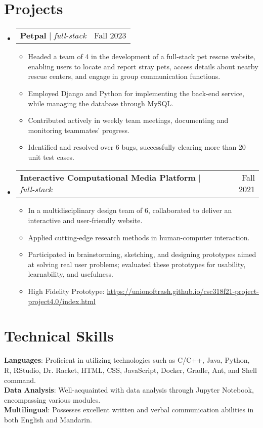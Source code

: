 \documentclass[letterpaper,11pt]{article}
\makeatletter
\newcommand{\resumeItem}[1]{
  \item\small{
    {#1 \vspace{-2pt}}
  }
}
\newcommand{\resumeProjectHeading}[2]{
    \item
    \begin{tabular*}{0.97\textwidth}{l@{\extracolsep{\fill}}r}
      \small#1 & #2 \\
    \end{tabular*}\vspace{-7pt}
}
\newcommand{\resumeSubHeadingListStart}{\begin{itemize}[leftmargin=0.15in, label={}]}
\newcommand{\resumeSubHeadingListEnd}{\end{itemize}}
\newcommand{\resumeItemListStart}{\begin{itemize}}
\newcommand{\resumeItemListEnd}{\end{itemize}\vspace{-5pt}}
\makeatother
\begin{document}
\section{Projects}
    \resumeSubHeadingListStart
      \resumeProjectHeading
          {\textbf{Petpal } $|$ \emph{full-stack}}{Fall 2023}
          \resumeItemListStart
            \resumeItem{Headed a team of 4 in the development of a full-stack pet rescue website, enabling users to locate and report stray pets, access details about nearby rescue centers, and engage in group communication functions.}
            \resumeItem{Employed Django and Python for implementing the back-end service, while managing the database through MySQL.}
            \resumeItem{Contributed actively in weekly team meetings, documenting and monitoring teammates’ progress.}
            \resumeItem{Identified and resolved over 6 bugs, successfully clearing more than 20 unit test cases.}
          \resumeItemListEnd
      \resumeProjectHeading
          {\textbf{Interactive Computational Media Platform } $|$ \emph{full-stack	}}{Fall 2021}
          \resumeItemListStart
            \resumeItem{In a multidisciplinary design team of 6, collaborated to deliver an interactive and user-friendly website.}
            \resumeItem{Applied cutting-edge research methods in human-computer interaction.}
            \resumeItem{Participated in brainstorming, sketching, and designing prototypes aimed at solving real user problems; evaluated these prototypes for usability, learnability, and usefulness.}
            \resumeItem{High Fidelity Prototype: \href{https://unionoftrash.github.io/csc318f21-project-project4.0/index.html}{\underline{https://unionoftrash.github.io/csc318f21-project-project4.0/index.html}}}
          \resumeItemListEnd
    \resumeSubHeadingListEnd



%
\section{Technical Skills}
 \begin{itemize}[leftmargin=0.15in, label={}]
    \small{\item{
     \textbf{Languages}{: Proficient in utilizing technologies such as C/C++, Java, Python, R, RStudio, Dr. Racket, HTML, CSS, JavaScript, Docker, Gradle, Ant, and Shell command.} \\
     \textbf{Data Analysis}{: Well-acquainted with data analysis through Jupyter Notebook, encompassing various modules.} \\
     \textbf{Multilingual}{: Possesses excellent written and verbal communication abilities in both English and Mandarin.}
    }}
 \end{itemize}


\end{document}
